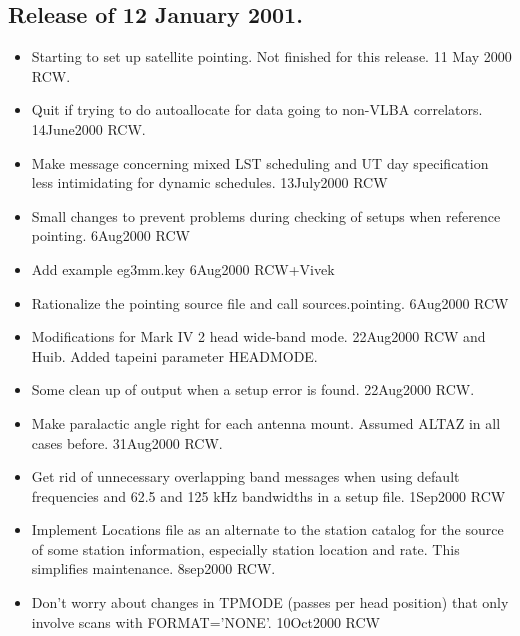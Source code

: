 \documentclass{report}
\begin{document}
\subsection{\label{SSSEC:12JAN2001}Release of 12 January 2001.}

\begin{itemize}

\item Starting to set up satellite pointing.  Not finished for this
      release.  11 May 2000 RCW.

\item Quit if trying to do autoallocate for data going to
      non-VLBA correlators.  14June2000 RCW.

\item Make message concerning mixed LST scheduling and UT day
      specification less intimidating for dynamic schedules.
      13July2000 RCW

\item Small changes to prevent problems during checking of
      setups when reference pointing.  6Aug2000 RCW

\item Add example eg3mm.key  6Aug2000 RCW+Vivek

\item Rationalize the pointing source file and call sources.pointing.
       6Aug2000 RCW

\item Modifications for Mark IV 2 head wide-band mode.  22Aug2000 RCW and Huib.
      Added tapeini parameter HEADMODE.

\item Some clean up of output when a setup error is found.
      22Aug2000 RCW.

\item Make paralactic angle right for each antenna mount.  Assumed
      ALTAZ in all cases before.  31Aug2000 RCW.

\item Get rid of unnecessary overlapping band messages when using
      default frequencies and 62.5 and 125 kHz bandwidths in a setup
      file.  1Sep2000 RCW

\item Implement Locations file as an alternate to the station
      catalog for the source of some station information, especially
      station location and rate.  This simplifies maintenance.
      8sep2000 RCW.

\item Don't worry about changes in TPMODE (passes per head position)
      that only involve scans with FORMAT='NONE'.  10Oct2000 RCW


\end{itemize}
\end{document}
